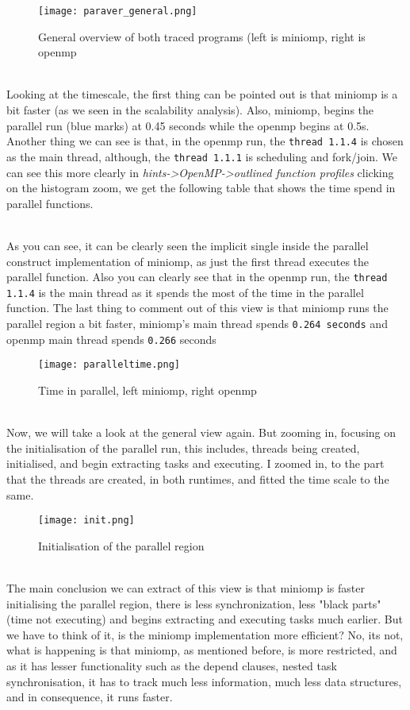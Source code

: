 \begin{figure}[h!]
    \centering
    \texttt{[image: paraver\_general.png]}
    \caption{General overview of both traced programs (left is miniomp, right is openmp}
\end{figure}
\par ~\\
Looking at the timescale, the first thing can be pointed out is that miniomp is a bit faster (as we seen in the scalability analysis). Also, miniomp, begins the parallel run (blue marks) at 0.45 seconds while the openmp begins at 0.5s. Another thing we can see is that, in the openmp run, the \texttt{thread 1.1.4} is chosen as the main thread, although, the \texttt{thread 1.1.1} is scheduling and fork/join. We can see this more clearly in \textit{hints->OpenMP->outlined function profiles} clicking on the histogram zoom, we get the following table that shows the time spend in parallel functions.

\par ~\\
As you can see, it can be clearly seen the implicit single inside the parallel construct implementation of miniomp, as just the first thread executes the parallel function. Also you can clearly see that in the openmp run, the \texttt{thread 1.1.4} is the main thread as it spends the most of the time in the parallel function. The last thing to comment out of this view is that miniomp runs the parallel region a bit faster, miniomp's main thread spends \texttt{0.264 seconds} and openmp main thread spends \texttt{0.266} seconds
\clearpage
\begin{figure}[htbp]
    \centering
    \texttt{[image: paralleltime.png]}
    \caption{Time in parallel, left miniomp, right openmp}
\end{figure}
\par ~\\
Now, we will take a look at the general view again. But zooming in, focusing on the initialisation of the parallel run, this includes, threads being created, initialised, and begin extracting tasks and executing. I zoomed in, to the part that the threads are created, in both runtimes, and fitted the time scale to the same.

\begin{figure}[htbp]
    \centering
    \texttt{[image: init.png]}
    \caption{Initialisation of the parallel region}
\end{figure}
\par ~\\
The main conclusion we can extract of this view is that miniomp is faster initialising the parallel region, there is less synchronization, less "black parts" (time not executing) and begins extracting and executing tasks much earlier. But we have to think of it, is the miniomp implementation more efficient? No, its not, what is happening is that miniomp, as mentioned before, is more restricted, and as it has lesser functionality such as the depend clauses, nested task synchronisation, it has to track much less information, much less data structures, and in consequence, it runs faster. 



